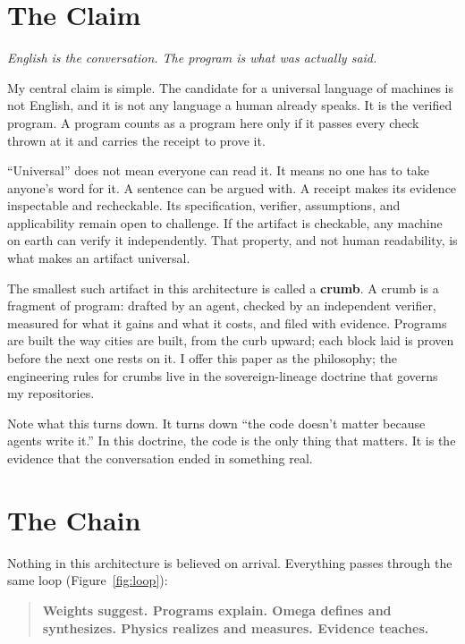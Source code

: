 \documentclass[11pt]{article}
\begin{document}
\section{The Claim}

\textit{English is the conversation. The program is what was actually
said.}

My central claim is simple. The candidate for a universal
language of machines is not English, and it is not any language a
human already speaks. It is the verified program. A program counts as
a program here only if it passes every check thrown at it and carries
the receipt to prove it.

``Universal'' does not mean everyone can read it. It means no one has
to take anyone's word for it. A sentence can be argued with. A receipt
makes its evidence inspectable and recheckable. Its specification,
verifier, assumptions, and applicability remain open to challenge.
If the artifact is checkable, any machine on earth can verify
it independently. That property, and not human readability, is what
makes an artifact universal.

The smallest such artifact in this architecture is called a
\textbf{crumb}. A crumb is a fragment of program: drafted by an agent,
checked by an independent verifier, measured for what it gains and
what it costs, and filed with evidence. Programs are built the way
cities are built, from the curb upward; each block laid is proven
before the next one rests on it. I offer this paper as the philosophy; the
engineering rules for crumbs live in the sovereign-lineage doctrine
that governs my repositories.

Note what this turns down. It turns down ``the code doesn't matter
because agents write it.'' In this doctrine, the code is the only
thing that matters. It is the evidence that the conversation ended in
something real.

\section{The Chain}

Nothing in this architecture is believed on arrival. Everything passes
through the same loop (Figure~\ref{fig:loop}):

\begin{quote}
\textbf{Weights suggest. Programs explain. Omega defines and
synthesizes. Physics realizes and measures. Evidence teaches.}
\end{quote}
\end{document}
